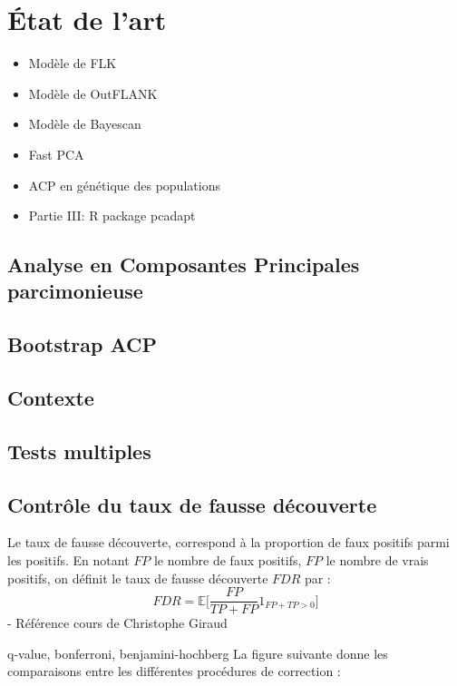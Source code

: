 \documentclass[12pt,twoside]{reedthesis}
\theoremstyle{definition}
\theoremstyle{definition}
\theoremstyle{remark}
\begin{document}
  \chapter{État de l'art}\label{etat-de-lart}
  
  \begin{itemize}
  \item
    Modèle de FLK
  \item
    Modèle de OutFLANK
  \item
    Modèle de Bayescan
  \item
    Fast PCA
  \item
    ACP en génétique des populations
  \item
    Partie III: R package pcadapt
  \end{itemize}
  
  \section{Analyse en Composantes Principales
  parcimonieuse}\label{analyse-en-composantes-principales-parcimonieuse}
  
  \section{Bootstrap ACP}\label{bootstrap-acp}
  
  \section{Contexte}\label{contexte}
  
  \section{Tests multiples}\label{tests-multiples}
  
  \section{Contrôle du taux de fausse
  découverte}\label{controle-du-taux-de-fausse-decouverte}
  
  Le taux de fausse découverte, correspond à la proportion de faux
  positifs parmi les positifs. En notant \(FP\) le nombre de faux
  positifs, \(FP\) le nombre de vrais positifs, on définit le taux de
  fausse découverte \(FDR\) par :
  \[ FDR = \mathbb{E}\Big[\frac{FP}{TP + FP} 1_{FP+TP > 0}\Big] \] -
  Référence cours de Christophe Giraud
  
  q-value, bonferroni, benjamini-hochberg La figure suivante donne les
  comparaisons entre les différentes procédures de correction :
  
\end{document}
